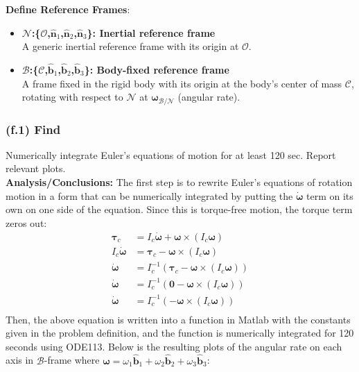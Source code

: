\documentclass[titlepage]{article}
\begin{document}
\textbf{Define Reference Frames}:
\begin{itemize}
	\item \textbf{$\mathcal{N}$:\{$\mathcal{O}$,$\hat{\boldsymbol{n}}_1$,$\hat{\boldsymbol{n}}_2$,$\hat{\boldsymbol{n}}_3$\}: Inertial reference frame\\}A generic inertial reference frame with its origin at $\mathcal{O}$.
	\item \textbf{$\mathcal{B}$:\{$\mathcal{C}$,$\hat{\boldsymbol{b}}_1$,$\hat{\boldsymbol{b}}_2$,$\hat{\boldsymbol{b}}_3$\}: Body-fixed reference frame\\}A frame fixed in the rigid body with its origin at the body's center of mass $\mathcal{C}$, rotating with respect to $\mathcal{N}$ at $\boldsymbol{\omega}_{\mathcal{B}/\mathcal{N}}$ (angular rate).
\end{itemize}

\subsubsection*{(f.1) Find}
Numerically integrate Euler's equations of motion for at least 120 sec. Report relevant plots.\\

\textbf{Analysis/Conclusions:}
The first step is to rewrite Euler's equations of rotation motion in a form that can be numerically integrated by putting the $\dot{\boldsymbol{\omega}}$ term on its own on one side of the equation. Since this is torque-free motion, the torque term zeros out:
\begin{equation}
	\begin{split}
		\boldsymbol{\tau}_c&=I_c\dot{\boldsymbol{\omega}}+\boldsymbol{\omega}\times\left(I_c\boldsymbol{\omega}\right) \\
		I_c\dot{\boldsymbol{\omega}}&=\boldsymbol{\tau}_c-\boldsymbol{\omega}\times\left(I_c\boldsymbol{\omega}\right) \\
		\dot{\boldsymbol{\omega}}&=I_c^{-1}\left(\boldsymbol{\tau}_c-\boldsymbol{\omega}\times\left(I_c\boldsymbol{\omega}\right)\right) \\
		\dot{\boldsymbol{\omega}}&=I_c^{-1}\left(\boldsymbol{0}-\boldsymbol{\omega}\times\left(I_c\boldsymbol{\omega}\right)\right) \\
		\dot{\boldsymbol{\omega}}&=I_c^{-1}\left(-\boldsymbol{\omega}\times\left(I_c\boldsymbol{\omega}\right)\right) \\
	\end{split}
\end{equation}
Then, the above equation is written into a function in Matlab with the constants given in the problem definition, and the function is numerically integrated for 120 seconds using ODE113. Below is the resulting plots of the angular rate on each axis in $\mathcal{B}$-frame where $\boldsymbol{\omega}=\omega_1\hat{\boldsymbol{b}}_1+\omega_2\hat{\boldsymbol{b}}_2+\omega_3\hat{\boldsymbol{b}}_3$:
\end{document}

